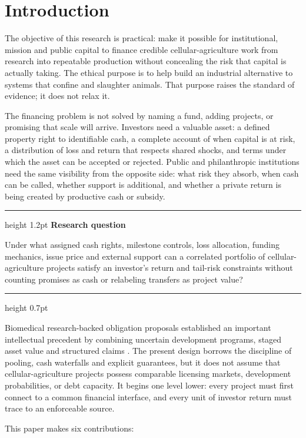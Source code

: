 \documentclass[11pt,a4paper]{article}
\newenvironment{paperbox}[1]{%
  \begin{center}\begin{minipage}{0.96\textwidth}%
  \color{Forest}\hrule height 1.2pt\vspace{0.65em}%
  {\large\bfseries #1}\par\smallskip\color{black}%
}{%
  \vspace{0.45em}\color{Gold}\hrule height 0.7pt
  \end{minipage}\end{center}%
}
\begin{document}
\section{Introduction}

The objective of this research is practical: make it possible for institutional, mission and public capital to finance credible cellular-agriculture work from research into repeatable production without concealing the risk that capital is actually taking. The ethical purpose is to help build an industrial alternative to systems that confine and slaughter animals. That purpose raises the standard of evidence; it does not relax it.

The financing problem is not solved by naming a fund, adding projects, or promising that scale will arrive. Investors need a valuable asset: a defined property right to identifiable cash, a complete account of when capital is at risk, a distribution of loss and return that respects shared shocks, and terms under which the asset can be accepted or rejected. Public and philanthropic institutions need the same visibility from the opposite side: what risk they absorb, when cash can be called, whether support is additional, and whether a private return is being created by productive cash or subsidy.

\begin{paperbox}{Research question}
Under what assigned cash rights, milestone controls, loss allocation, funding mechanics, issue price and external support can a correlated portfolio of cellular-agriculture projects satisfy an investor's return and tail-risk constraints without counting promises as cash or relabeling transfers as project value?
\end{paperbox}

Biomedical research-backed obligation proposals established an important intellectual precedent by combining uncertain development programs, staged asset value and structured claims \citep{fernandez2012rbo,fagnan2013cancer,fagnan2014orphan}. The present design borrows the discipline of pooling, cash waterfalls and explicit guarantees, but it does not assume that cellular-agriculture projects possess comparable licensing markets, development probabilities, or debt capacity. It begins one level lower: every project must first connect to a common financial interface, and every unit of investor return must trace to an enforceable source.

This paper makes six contributions:
\end{document}
